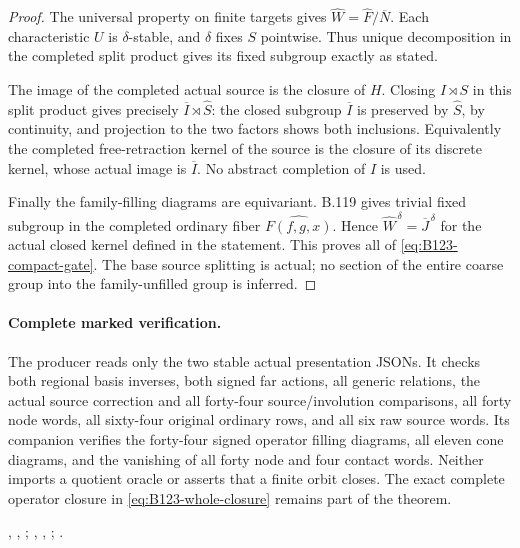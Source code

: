 \begin{proof}
The universal property on finite targets gives
$\widehat W=\widehat F/\overline N$. Each characteristic
$U$ is $\delta$-stable, and $\delta$ fixes $S$ pointwise.
Thus unique decomposition in the completed split product gives
its fixed subgroup exactly as stated.

The image of the completed actual source is the closure of $H$.
Closing $I\rtimes S$ in this split product gives precisely
$\overline I\rtimes\widehat S$: the closed subgroup
$\overline I$ is preserved by $\widehat S$, by continuity,
and projection to the two factors shows both inclusions.
Equivalently the completed free-retraction kernel of the source
is the closure of its discrete kernel, whose actual image is
$\overline I$. No abstract completion of $I$ is used.

Finally the family-filling diagrams are equivariant. B.119 gives
trivial fixed subgroup in the completed ordinary fiber
$\widehat{F(f,g,x)}$. Hence
$\widehat W^{\,\delta}=\overline J^{\,\delta}$ for the
actual closed kernel defined in the statement. This proves
all of \eqref{eq:B123-compact-gate}. The base source splitting
is actual; no section of the entire coarse group into the
family-unfilled group is inferred.
\end{proof}

\paragraph{Complete marked verification.}
The producer reads only the two stable actual presentation JSONs.
It checks both regional basis inverses, both signed far actions,
all generic relations, the actual source correction and all
forty-four source/involution comparisons, all forty node words,
all sixty-four original ordinary rows, and all six raw source
words. Its companion verifies the forty-four signed operator
filling diagrams, all eleven cone diagrams, and the vanishing
of all forty node and four contact words. Neither imports a
quotient oracle or asserts that a finite orbit closes. The exact
complete operator closure in \eqref{eq:B123-whole-closure}
remains part of the theorem.
\begingroup\raggedright
{},
,
;
,
,
;
.
\par\endgroup
